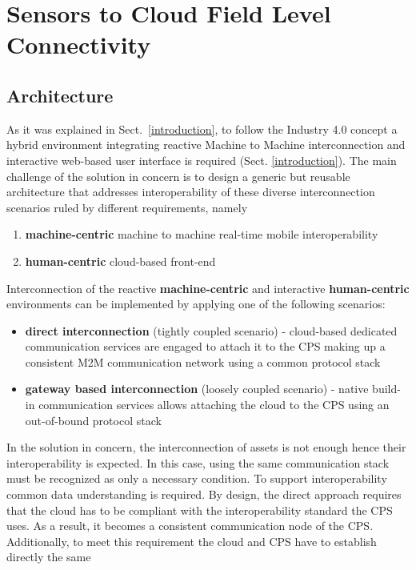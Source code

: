 \documentclass{jacsart}
\begin{document}
\section{Sensors to Cloud Field Level Connectivity}\label{cloud-to-sensors-field-level-connectivity}

\subsection{Architecture}\label{subs.architecture}

As it was explained in Sect.~\ref*{introduction}, to follow the Industry 4.0 concept a hybrid environment integrating reactive Machine to Machine interconnection and interactive web-based user interface is required (Sect. \ref*{introduction}). The main challenge of the solution in concern is to design a generic but reusable architecture that addresses interoperability of these diverse interconnection scenarios ruled by different requirements, namely

\begin{enumerate}
      \item \textbf{machine-centric} machine to machine real-time mobile interoperability
      \item \textbf{human-centric} cloud-based front-end
\end{enumerate}

Interconnection of the reactive \textbf{machine-centric} and interactive \textbf{human-centric} environments can be implemented by applying one of the following scenarios:

\begin{itemize}
      \item \textbf{direct interconnection} (tightly coupled scenario) - cloud-based dedicated communication services are engaged to attach it to the CPS making up a consistent M2M communication network using a common protocol stack
      \item \textbf{gateway based interconnection} (loosely coupled scenario) - native build-in communication services allows attaching the cloud to the CPS using an out-of-bound protocol stack
\end{itemize}

In the solution in concern, the interconnection of assets is not enough hence their interoperability is expected. In this case, using the same communication stack must be recognized as only a necessary condition. To support interoperability common data understanding is required. By design, the direct approach requires that the cloud has to be compliant with the interoperability standard the CPS uses. As a result, it becomes a consistent communication node of the CPS. Additionally, to meet this requirement the cloud and CPS have to establish directly the same
\end{document}
